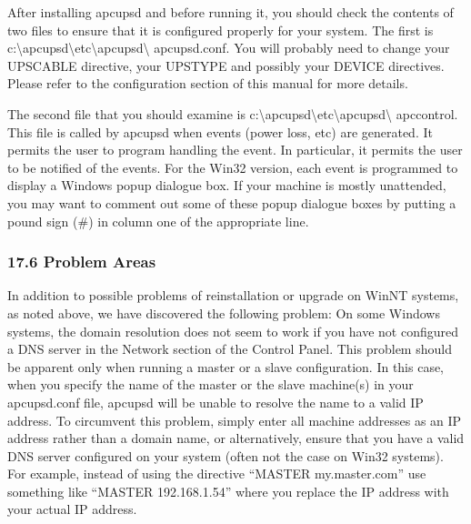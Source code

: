 \label{index-Windows_002c-Post-Installation-177}
After installing apcupsd and before running it, you should check the contents
of two files to ensure that it is configured properly for your system. The
first is
c:\textbackslash{}apcupsd\textbackslash{}etc\textbackslash{}apcupsd\textbackslash
{}apcupsd.conf. You will probably need to change your UPSCABLE directive, your
UPSTYPE and possibly your DEVICE directives. Please refer to the configuration
section of this manual for more details.  

The second file that you should examine is
c:\textbackslash{}apcupsd\textbackslash{}etc\textbackslash{}apcupsd\textbackslash
{}apccontrol. This file is called by apcupsd when events (power loss, etc) are
generated. It permits the user to program handling the event. In particular,
it permits the user to be notified of the events. For the Win32 version, each
event is programmed to display a Windows popup dialogue box. If your machine
is mostly unattended, you may want to comment out some of these popup dialogue
boxes by putting a pound sign (\#) in column one of the appropriate line. 

\label{Problem-Areas}

\subsubsection*{17.6 Problem Areas}

\label{index-Problems_002c-Windows-178}
\label{index-Windows_002c-Problems-179}
In addition to possible problems of reinstallation or upgrade on WinNT
systems, as noted above, we have discovered the following problem: On some
Windows systems, the domain resolution does not seem to work if you have not
configured a DNS server in the Network section of the Control Panel. This
problem should be apparent only when running a master or a slave
configuration. In this case, when you specify the name of the master or the
slave machine(s) in your apcupsd.conf file, apcupsd will be unable to resolve
the name to a valid IP address. To circumvent this problem, simply enter all
machine addresses as an IP address rather than a domain name, or
alternatively, ensure that you have a valid DNS server configured on your
system (often not the case on Win32 systems).  For example, instead of using
the directive ``MASTER my.master.com'' use something like ``MASTER
192.168.1.54'' where you replace the IP address with your actual IP address.  

